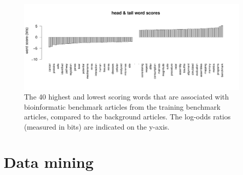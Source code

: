 \documentclass[fleqn,10pt]{SelfArx} %
\begin{document}
\begin{figure}[H] \centering
\includegraphics[width=0.99\textwidth]{wordScores.pdf} \caption{The 40
  highest and lowest scoring words that are associated with
  bioinformatic benchmark articles from the training benchmark articles,
  compared to the background articles. The log-odds ratios (measured
  in bits) are indicated on the y-axis. }
\label{fig:wordScores} \end{figure}







\clearpage
\newpage

\section*{Data mining} %
\end{document}
